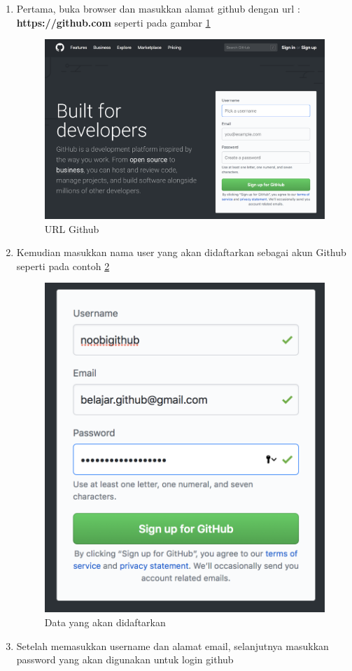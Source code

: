 \begin{enumerate}
\item Pertama, buka browser dan masukkan alamat github dengan url :\textbf{ https://github.com} seperti pada gambar \ref{url}
\begin{figure}[!htbp]
\centerline{\includegraphics[width=.75\textwidth]{Figures/akunGit/1.PNG}}
\caption{URL Github}
\label{url}
\end{figure}
\item Kemudian masukkan nama user yang akan didaftarkan sebagai akun Github seperti pada contoh \ref{daftar}
\begin{figure}[!htbp]
\centerline{\includegraphics[width=.75\textwidth]{Figures/akunGit/2.PNG}}
\caption{Data yang akan didaftarkan}
\label{daftar}
\end{figure}
\item Setelah memasukkan username dan alamat email, selanjutnya masukkan password yang akan digunakan untuk login github

\end{enumerate}
